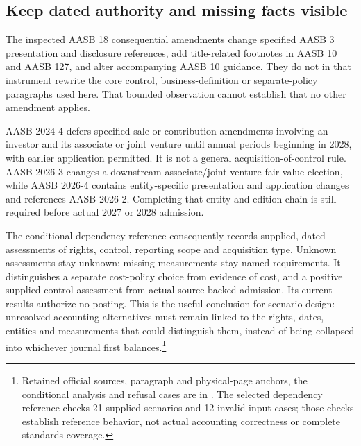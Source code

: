 \subsection{Keep dated authority and missing facts visible}

The inspected AASB 18 consequential amendments change specified AASB 3 presentation and disclosure references, add title-related footnotes in AASB 10 and AASB 127, and alter accompanying AASB 10 guidance. They do not in that instrument rewrite the core control, business-definition or separate-policy paragraphs used here.\citep[Appendix D, pp.~57, 70, 101--102]{aasb18scope2024} That bounded observation cannot establish that no other amendment applies.

AASB 2024-4 defers specified sale-or-contribution amendments involving an investor and its associate or joint venture until annual periods beginning in 2028, with earlier application permitted. It is not a general acquisition-of-control rule.\citep[paras.~6--11]{aasb2024controltiming} AASB 2026-3 changes a downstream associate/joint-venture fair-value election, while AASB 2026-4 contains entity-specific presentation and application changes and references AASB 2026-2.\citep[p.~5]{aasb2026associate}\citep[paras.~1--3]{aasb2026presentation} Completing that entity and edition chain is still required before actual 2027 or 2028 admission.

The conditional dependency reference consequently records supplied, dated assessments of rights, control, reporting scope and acquisition type. Unknown assessments stay unknown; missing measurements stay named requirements. It distinguishes a separate cost-policy choice from evidence of cost, and a positive supplied control assessment from actual source-backed admission. Its current results authorize no posting. This is the useful conclusion for scenario design: unresolved accounting alternatives must remain linked to the rights, dates, entities and measurements that could distinguish them, instead of being collapsed into whichever journal first balances.\footnote{Retained official sources, paragraph and physical-page anchors, the conditional analysis and refusal cases are in . The selected dependency reference checks 21 supplied scenarios and 12 invalid-input cases; those checks establish reference behavior, not actual accounting correctness or complete standards coverage.}
